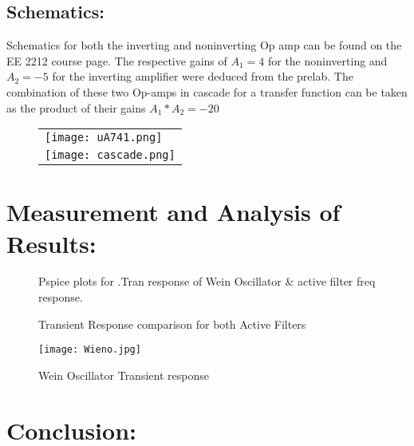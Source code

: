 \documentclass[10pt,a4paper]{article}
\begin{document}
\subsection{Schematics:}



Schematics for both the inverting and noninverting Op amp can be found on the EE 2212 course page. The respective gains of $A_{1}= 4$ for the noninverting and $A_{2}=-5$ for the inverting amplifier were deduced from the prelab. The combination of these two Op-amps in cascade for a transfer function can be taken as the product of their gains $A_{1}*A_{2}= -20$
\begin{figure} [!ht]%
\begin{tabular}{l}
 \texttt{[image: uA741.png]}\\ 
{\texttt{[image: cascade.png]}} \\ 
\end{tabular} 
\end{figure}


\pagebreak
\section*{Measurement and Analysis of Results:}

\begin{figure}[!ht]
    \centering
    \qquad
    \caption{Pspice plots for .Tran response of Wein Oscillator $\&$ active filter freq response.}%
    \label{fig:example}%
    
\end{figure}


\begin{figure}[!ht]
    \centering
    \qquad
    \caption{Transient Response comparison for both Active Filters}%
    \label{fig:example}%
\end{figure}
\vspace{5mm}
\begin{figure}[h!]
\begin{center}
  \texttt{[image: Wieno.jpg]}
  \caption{Wein Oscillator Transient response}
\end{center}
\end{figure}


\section*{Conclusion:}

 
\end{document}
